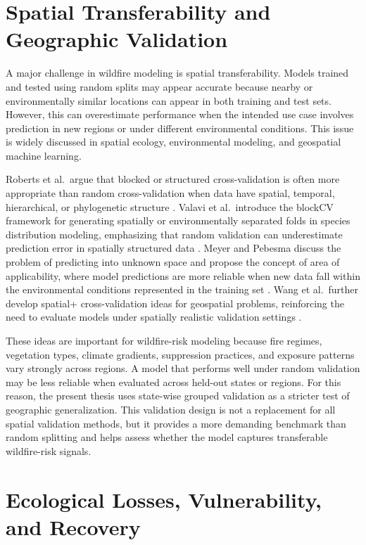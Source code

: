 \section{Spatial Transferability and Geographic Validation}

A major challenge in wildfire modeling is spatial transferability. Models trained and tested using random splits may appear accurate because nearby or environmentally similar locations can appear in both training and test sets. However, this can overestimate performance when the intended use case involves prediction in new regions or under different environmental conditions. This issue is widely discussed in spatial ecology, environmental modeling, and geospatial machine learning.

Roberts et al.\ argue that blocked or structured cross-validation is often more appropriate than random cross-validation when data have spatial, temporal, hierarchical, or phylogenetic structure \citep{roberts2017crossvalidation}. Valavi et al.\ introduce the blockCV framework for generating spatially or environmentally separated folds in species distribution modeling, emphasizing that random validation can underestimate prediction error in spatially structured data \citep{valavi2019blockcv}. Meyer and Pebesma discuss the problem of predicting into unknown space and propose the concept of area of applicability, where model predictions are more reliable when new data fall within the environmental conditions represented in the training set \citep{meyer2021aoa}. Wang et al.\ further develop spatial+ cross-validation ideas for geospatial problems, reinforcing the need to evaluate models under spatially realistic validation settings \citep{wang2023spatialplus}.

These ideas are important for wildfire-risk modeling because fire regimes, vegetation types, climate gradients, suppression practices, and exposure patterns vary strongly across regions. A model that performs well under random validation may be less reliable when evaluated across held-out states or regions. For this reason, the present thesis uses state-wise grouped validation as a stricter test of geographic generalization. This validation design is not a replacement for all spatial validation methods, but it provides a more demanding benchmark than random splitting and helps assess whether the model captures transferable wildfire-risk signals.

\section{Ecological Losses, Vulnerability, and Recovery}

